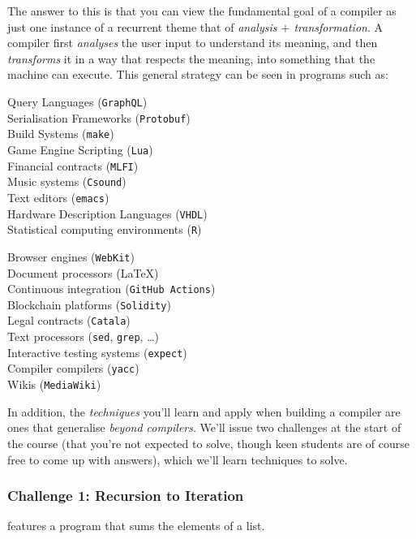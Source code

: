 The answer to this is that you can view the fundamental goal of a compiler as just one instance of a recurrent theme that of \emph{analysis $+$ transformation}. A compiler first \emph{analyses} the user input to understand its meaning, and then \emph{transforms} it in a way that respects the meaning, into something that the machine can execute. This general strategy can be seen in programs such as:

\begin{minipage}[t]{0.5\textwidth}
Query Languages (\texttt{GraphQL})\\
Serialisation Frameworks (\texttt{Protobuf})\\
Build Systems (\texttt{make})\\
Game Engine Scripting (\texttt{Lua}) \\
Financial contracts (\texttt{MLFI})\\
Music systems (\texttt{Csound}) \\
Text editors (\texttt{emacs})\\
Hardware Description Languages (\texttt{VHDL}) \\
Statistical computing environments (\texttt{R})\\
\end{minipage}%
\begin{minipage}[t]{0.5\textwidth}
Browser engines (\texttt{WebKit})\\
Document processors (\LaTeX)\\
Continuous integration (\texttt{GitHub Actions})\\
Blockchain platforms (\texttt{Solidity})\\
Legal contracts (\texttt{Catala})\\
Text processors (\texttt{sed}, \texttt{grep}, \ldots)\\
Interactive testing systems (\texttt{expect})\\
Compiler compilers (\texttt{yacc})\\
Wikis (\texttt{MediaWiki})
\end{minipage}

In addition, the \emph{techniques} you'll learn and apply when building a compiler are ones that generalise \emph{beyond compilers}. We'll issue two challenges at the start of the course (that you're not expected to solve, though keen students are of course free to come up with answers), which we'll learn techniques to solve.

\subsubsection{Challenge 1: Recursion to Iteration}
 features a program that sums the elements of a list.

